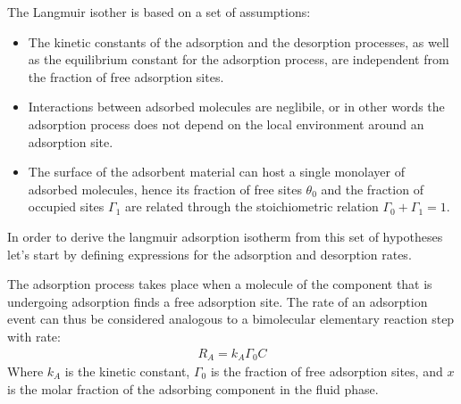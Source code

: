 \documentclass[letterpaper,10pt,english]{jupyterBook}
\begin{document}
\sphinxAtStartPar
The Langmuir isother is based on a set of assumptions:
\begin{itemize}
\item {} 
\sphinxAtStartPar
The kinetic constants of the adsorption and the desorption processes, as well as the equilibrium constant for the adsorption process, are independent from the fraction of free adsorption sites.

\item {} 
\sphinxAtStartPar
Interactions between adsorbed molecules are neglibile, or in other words the adsorption process does not depend on the local environment around an adsorption site.

\item {} 
\sphinxAtStartPar
The surface of the adsorbent material can host a single monolayer of adsorbed molecules, hence its fraction of free sites \(\theta_0\) and the fraction of occupied sites \(\Gamma_1\) are related through the stoichiometric relation \(\Gamma_0+\Gamma_1=1\).

\end{itemize}

\sphinxAtStartPar
In order to derive the langmuir adsorption isotherm from this set of hypotheses let’s start by defining expressions for the adsorption and desorption rates.

\sphinxAtStartPar
The adsorption process takes place when a molecule of the component that is undergoing adsorption finds a free adsorption site. The rate of an adsorption event can thus be considered analogous to a bimolecular elementary reaction step with rate:
\begin{equation}\label{equation:Langmuir_isotherm:LANGeq1}
\begin{split}
R_A=k_A\Gamma_0{C}
\end{split}
\end{equation}
\sphinxAtStartPar
Where \(k_A\) is the kinetic constant, \(\Gamma_0\) is the fraction of free adsorption sites,  and \(x\) is the molar fraction of the adsorbing component in the fluid phase.
\end{document}
